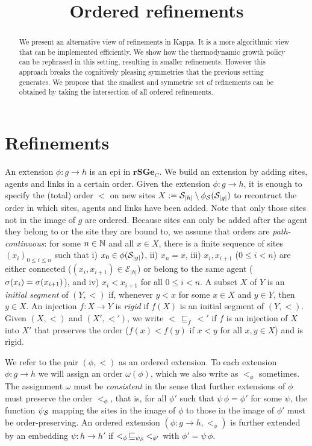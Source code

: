 \documentclass[a4paper,12pt]{article}
\title{Ordered refinements}
\newcommand{\anon}[1]{\left|#1\right|}
\newcommand{\rSGe}{\mathbf{rSGe}}
\newcommand{\edges}{\mathcal{E}}
\newcommand{\ord}{\omega}
\begin{document}
\maketitle

\begin{abstract}
  We present an alternative view of refinements in Kappa.
  It is a more algorithmic view that can be implemented efficiently.
  We show how the thermodynamic growth policy
  can be rephrased in this setting,
  resulting in smaller refinements.
  However this approach breaks the cognitively pleasing symmetries
  that the previous setting generates.
  We propose that the smallest and symmetric set of refinements
  can be obtained by taking the intersection of all ordered refinements.
\end{abstract}

\section{Refinements}

An extension $\phi: g \to h$ is an epi in $\rSGe_C$.
We build an extension by adding sites, agents and links
in a certain order.
Given the extension $\phi: g \to h$,
it is enough to specify the (total) order $<$ on new sites
$X := \sites_{\anon{h}} \setminus \phi_\sites(\sites_{\anon{g}})$
to recontruct the order in which
sites, agents and links have been added.
Note that only those sites not in the image of $g$ are ordered.
Because sites can only be added after
the agent they belong to
or the site they are bound to,
we assume that orders are \emph{path-continuous}:
for some $n \in \mathbb{N}$ and all $x \in X$,
there is a finite sequence of sites $(x_i)_{0 \leq i \leq n}$
such that i) $x_0 \in \phi(\sites_{\anon{g}})$,
ii) $x_n = x$,
iii) $x_i,x_{i+1}$ ($0 \leq i < n$)
are either connected ($(x_i,x_{i+1}) \in \edges_{\anon{h}}$)
or belong to the same agent ($\sigma(x_i) = \sigma(x_{i+1})$),
and iv) $x_i < x_{i+1}$ for all $0 \leq i < n$.
A subset $X$ of $Y$ is an \emph{initial segment} of $(Y,<)$
if, whenever $y < x$ for some $x \in X$ and $y \in Y$,
then $y \in X$.
An injection $f: X \to Y$ is \emph{rigid} %
if $f(X)$ is an initial segment of $(Y,<)$.
Given $(X,<)$ and $(X',<')$,
we write $< \,\sqsubseteq_f\, <'$ if
$f$ is an injection of $X$ into $X'$
that preserves the order
($f(x) < f(y)$ if $x < y$ for all $x,y \in X$)
and is rigid.

We refer to the pair $(\phi,<)$
as an ordered extension.
To each extension $\phi: g \to h$
we will assign an order $\ord(\phi)$,
which we also write as $<_\phi$ sometimes.
The assignment $\ord$ must be \emph{consistent}
in the sense that further extensions of $\phi$
must preserve the order $<_\phi$,
that is, for all $\phi'$ such that $\psi\,\phi = \phi'$
for some $\psi$, the function $\psi_{\mathcal{S}}$ mapping the sites
in the image of $\phi$ to those in the image of $\phi'$
must be order-preserving.
An ordered extension $(\phi: g \to h, <_\phi)$
is further extended by an embedding $\psi: h \to h'$
if $<_\phi \,\sqsubseteq_{\psi_{\mathcal{S}}}\, <_{\phi'}$
with $\phi' = \psi\,\phi$.
\end{document}
